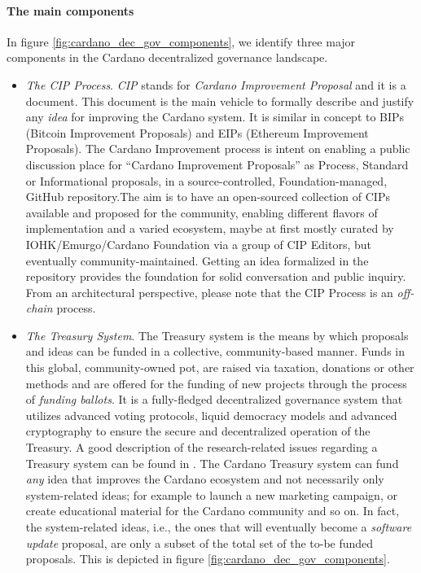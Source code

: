 \paragraph{The main components}
In figure \ref{fig:cardano_dec_gov_components}, we identify three major 
components in the Cardano decentralized governance landscape.
\begin{itemize}
	\item \emph{The CIP Process}. \emph{CIP} stands for \emph{Cardano 
		Improvement Proposal} and it is a document. This document is the main 
	vehicle to formally describe and justify any \emph{idea} for improving the 
	Cardano system. It is similar in concept to BIPs (Bitcoin Improvement 
	Proposals)  and EIPs (Ethereum Improvement Proposals). The Cardano 
	Improvement process is intent on enabling a public discussion place for 
	“Cardano Improvement Proposals” as Process, Standard or Informational 
	proposals, in a source-controlled, Foundation-managed, GitHub 
	repository.The aim is to have an open-sourced collection of CIPs available 
	and proposed for the community, enabling different flavors of 
	implementation and a varied ecosystem, maybe at first mostly curated by 
	IOHK/Emurgo/Cardano Foundation via a group of CIP Editors, but eventually 
	community-maintained. Getting an idea formalized in the repository provides 
	the foundation for solid conversation and public inquiry. From an 
	architectural perspective, please note that the CIP Process is an 
	\emph{off-chain} process.
	
	\item \emph{The Treasury System}. The Treasury system is the means by 
	which proposals and ideas can be funded in a collective, community-based 
	manner. Funds in this global, community-owned pot, are raised via taxation, 
	donations or other methods and are offered for the funding of new projects 
	through the process of \emph{funding ballots}. It is a fully-fledged 
	decentralized 
	governance system that utilizes advanced voting protocols, liquid democracy 
	models and advanced cryptography to ensure the secure and decentralized 
	operation of the Treasury. A good description of the research-related 
	issues regarding a Treasury system can be found in 
	\cite{cryptoeprint:2018:435}. The Cardano Treasury system can 
	fund \emph{any} idea that improves the Cardano ecosystem and not 
	necessarily only system-related ideas; for example to launch a new 
	marketing campaign, or create educational material for the Cardano 
	community and so on. In fact, the system-related ideas, 
	i.e., the ones that will eventually become a \emph{software update} 
	proposal, are only a subset of the total set of the to-be funded proposals. 
	This is depicted in figure \ref{fig:cardano_dec_gov_components}.
	

\end{itemize}
